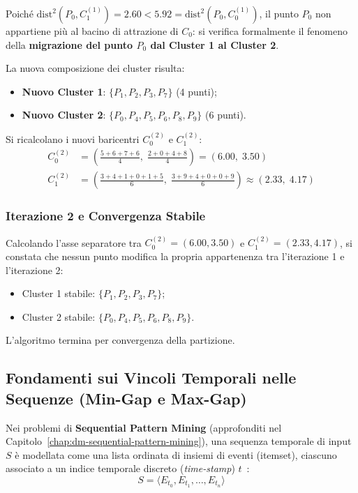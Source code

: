 Poiché $\mathrm{dist}^2(P_0, C_1^{(1)}) = 2.60 < 5.92 = \mathrm{dist}^2(P_0, C_0^{(1)})$, il punto $P_0$ non appartiene più al bacino di attrazione di $C_0$: si verifica formalmente il fenomeno della \textbf{migrazione del punto $P_0$ dal Cluster 1 al Cluster 2}.

La nuova composizione dei cluster risulta:
\begin{itemize}
    \item \textbf{Nuovo Cluster 1}: $\{P_1, P_2, P_3, P_7\}$ (4 punti);
    \item \textbf{Nuovo Cluster 2}: $\{P_0, P_4, P_5, P_6, P_8, P_9\}$ (6 punti).
\end{itemize}

Si ricalcolano i nuovi baricentri $C_0^{(2)}$ e $C_1^{(2)}$:
\begin{align}
C_0^{(2)} &= \left( \frac{5 + 6 + 7 + 6}{4}, \; \frac{2 + 0 + 4 + 8}{4} \right) = (6.00, \; 3.50) \\[4pt]
C_1^{(2)} &= \left( \frac{3 + 4 + 1 + 0 + 1 + 5}{6}, \; \frac{3 + 9 + 4 + 0 + 0 + 9}{6} \right) \approx (2.33, \; 4.17)
\end{align}

\FloatBarrier
\subsubsection{Iterazione 2 e Convergenza Stabile}
Calcolando l'asse separatore tra $C_0^{(2)} = (6.00, 3.50)$ e $C_1^{(2)} = (2.33, 4.17)$, si constata che nessun punto modifica la propria appartenenza tra l'iterazione 1 e l'iterazione 2:
\begin{itemize}
    \item Cluster 1 stabile: $\{P_1, P_2, P_3, P_7\}$;
    \item Cluster 2 stabile: $\{P_0, P_4, P_5, P_6, P_8, P_9\}$.
\end{itemize}
L'algoritmo termina per convergenza della partizione.


\FloatBarrier
\subsection{Fondamenti sui Vincoli Temporali nelle Sequenze (Min-Gap e Max-Gap)}
\label{sec:dm-seq-gap-constraints}

Nei problemi di \textbf{Sequential Pattern Mining} (approfonditi nel Capitolo~\ref{chap:dm-sequential-pattern-mining}), una sequenza temporale di input $S$ è modellata come una lista ordinata di insiemi di eventi (itemset), ciascuno associato a un indice temporale discreto (\textit{time-stamp}) $t$~\cite{tan2018, agrawal1995, srikant1996}:
\begin{equation}
S = \langle E_{t_0}, E_{t_1}, \dots, E_{t_n} \rangle
\end{equation}

